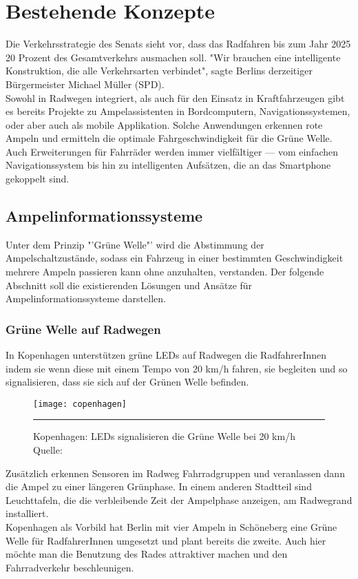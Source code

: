 \chapter{\label{chap:state}Bestehende Konzepte}
Die Verkehrsstrategie des Senats sieht vor, dass das Radfahren bis zum Jahr 2025 20 Prozent des Gesamtverkehrs ausmachen soll. "Wir brauchen eine intelligente Konstruktion, die alle Verkehrsarten verbindet", sagte Berlins derzeitiger Bürgermeister Michael Müller (SPD). \cite{Mopo}\\
Sowohl in Radwegen integriert, als auch für den Einsatz in Kraftfahrzeugen gibt es bereits Projekte zu Ampelassistenten in Bordcomputern, Navigationssystemen, oder aber auch als mobile Applikation. Solche Anwendungen erkennen rote Ampeln und ermitteln die optimale Fahrgeschwindigkeit für die Grüne Welle. Auch Erweiterungen für Fahrräder werden immer vielfältiger --- vom einfachen Navigationssystem bis hin zu intelligenten Aufsätzen, die an das \gls{Smartphone} gekoppelt sind.
\section{Ampelinformationssysteme}
Unter dem Prinzip "'Grüne Welle"' wird die Abstimmung der Ampelschaltzustände, sodass ein Fahrzeug in einer bestimmten Geschwindigkeit mehrere Ampeln passieren kann ohne anzuhalten, verstanden. Der folgende Abschnitt soll die existierenden Lösungen und Ansätze für Ampelinformationssysteme darstellen.
\subsection{Grüne Welle auf Radwegen}
In Kopenhagen unterstützen grüne \glspl{LED} auf Radwegen die RadfahrerInnen indem sie wenn diese mit einem Tempo von 20 km/h fahren, sie begleiten und so signalisieren, dass sie sich auf der Grünen Welle befinden. 
\begin{figure}[H]  
    \centering  
    \texttt{[image: copenhagen]} 
    \rule{35em}{0.5pt}
    \label{fig:copenhagen}
    \caption[Grüne Welle durch \glspl{LED}]{Kopenhagen: \glspl{LED} signalisieren die Grüne Welle bei 20 km/h  Quelle: \cite{NYT}}
\end{figure}
Zusätzlich erkennen Sensoren im Radweg Fahrradgruppen und veranlassen dann die Ampel zu einer längeren Grünphase. In einem anderen Stadtteil sind Leuchttafeln, die die verbleibende Zeit der Ampelphase anzeigen, am Radwegrand installiert\cite{KopIng}.\\
Kopenhagen als Vorbild hat Berlin mit vier Ampeln in Schöneberg eine Grüne Welle für RadfahrerInnen umgesetzt und plant bereits die zweite\cite{BZ}. Auch hier möchte man die Benutzung des Rades attraktiver machen und den Fahrradverkehr beschleunigen.
